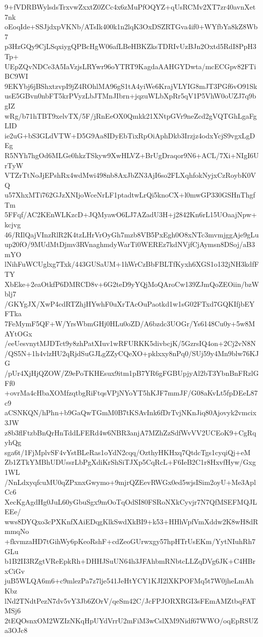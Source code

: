 9+fVDRBWylsdsTrxvwZxxtZ0ZCc4x6zMuPfOQYZ+qUsRCMv2XT7zr40avnXet7nk
oEoqIde+SSJjdxpVKNb/ATsIk400k1n2lqK3OxDSZRTGva4if0+WYfbYa8kZ8Wb7
p3HzGQy9CjLSqxiygQPBcHgW06afLBeHBKZksTDRIvUzBJn2Oxtd5RdI8PpH3Tp+
UEpZQvNDCe3A5IaVzjsLRYwr96oYTRT9KagdaAAHGYDwta/mcECGpv82FTiBC9WI
9EKYbj6jBShxtzvpI9jZ4ROhlMA96gS1tA4yiWe6KrajVLYIG8mJT3PGf6vO91Sk
usE5GBvn0nbFT5krPVyzLbJTMnJIbrn+jqzuWLbXpRr5qV1P5VhW0oUZJ7q9bgIZ
wRg/b71hTBT9xelvTX/5F/jRnEeOX0Qmkk21XNtpGVr9neZcd2gVQTGhLgaFgLID
ie2uG+bS3GLdVTW+D5G9Aa8IDyEbTixRpOiAphDkb3Irzjz4odxYcjS9vgxLgDEg
R5NYh7hgOd6MLGe0hkzTSkyw9XwHLVZ+BrUgDraqor9N6+ACL/7Xi+NIgI6UrTyW
VTZrTtNoJjEPshRx4wdMwi498nb8AxJbZN3AjI6so2FLXqhfokNyjxCzRoybK0VQ
u57XhxMTi762GJzXNIjoWceNrLF1ptadtwLrQi5knoCX+l0mwGP330GSHnThgfTm
5FFqf/AC2KEnWLKzcD+JQMyawO6LJ7AZadU3H+j2842Kn6rL15UOaajNpw+kcjvg
46/RIlQajVInzRlR2K4tzLHrVrOyGh7mzb8VB5PxEgh0O8xNTc3mvmjggAje9gLu
up20fO/9MUdMtDjmv3RVnaghmdyWarTi0WEREz7kdNVjfCjAymsn8DSoj/aB3mYO
lNihFuWCUglxg7Txk/443GUSaUM+1hWrCzBbFBLTfKyxh6XGS1o132jNH3kdfFTY
XbEke+2eaOtkfP6DMRCD8v+6G2teD9yYQjMoQAroCw139ZJmQoZEOiin/bzWblj7
/GKYgJX/XwP4cdRTZhjHYwhF0uXrTAcOuPaotkd1w1sG02FTxd7GQKIfjbEYFTka
7FeMymF5QF+W/YrsWbmGHj0HLu0oZD/A6bzdc3UOGr/Ys6148Cu0y+5w8MAYtOGx
/eeUesvnytMJDTct9y8zhPatXIuv1wRFURKK5divbcjK/5GzrsIQ4on+2Cj2vN8N
/QS5N+1h4vlzHU2qRjdSuGJLgZZyCQeXO+pklxxy8nPq0/SUj59y4Mn9blw76KJG
/pUr4XjHjQZOW/Z9ePoTKHEsux9itm1pB7YR6gFGBUpjyAl2bT3YbnBnFRzlGFf0
+ovrMa4cHbaXOMfzqtbgRiFtqsVPjNYoYT5hKJF7mmJF/G08aKvLt5fpDEeL87c9
aCSNKQN/hPhn+b9GaQwTGmM0B7tKSAvInk6fDrTvjNKnJiq80Ajovyk2vmcix3JW
z8b3flFtzbBnQrHnTddLFERd4w6NBR3anjA7MZhZzSdfWvVV2UCEoK9+CgRqyhQg
sga6t/1FjMplvSF4vYstBLeRas1oYdN2cqq/OzthyHKHxq7QtdcTgs1cyqiQj+eM
Zb1ZTkYMBhUDUssrLbPgXdiKrShSiTJXp5CqRcL+F6IeB2C1r8HxvfHyw/Gxg1WL
/NnLdxyqfcuMU0qZPxnxGwymo+9mjrQZEevRWGx0ed5wjsISim2oyU+Me3AplCc6
XecKgAgdHg0JuL60yGbuSgx9mOoTqOdSI80FSRoNXkCyvjr7N7QfMSEFMQJLEEe/
wws8DYQxo3cPXKnfXAiEDqgKlkSwdXkBI9+k53+HHhVpfVmXddw2K8wH8dRmmqNo
+fkvmzaHD7tGihWy6pKeoRshF+cdZeoGUrwxgy57hpHTrUsEKm/YytNIuhRh7GLu
b1B2II3RZgtVReEpkRh+DHHJSuUN64h3JFAhbmRNbtcLLZqDVg6JK+C4HBrxCiGv
juB5WLQA6m6+c9mlezPa7z7lje541JeHtYCY1KJI2lXKPOFMq5t7W0jheLmAhKbz
lNd2TNdtPezN7dv5vY3Jb6ZOrV/qeSm42C/JcFPJORXRGI3sFEmAMZtbqFATMSj6
2tEQOsnxOM2WZIzNKqHpUYdVrrU2mFiM3wCslXM9Nidf67WWO/oqEpRSUZa3OJc8
